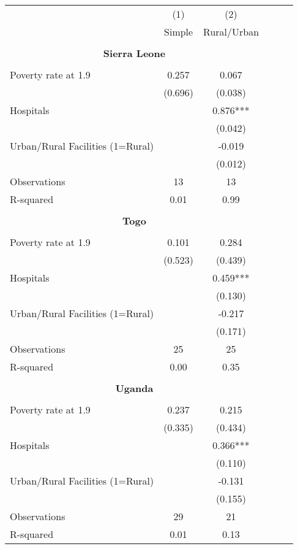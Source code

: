 \begin{tabular}{l*{5}{c}} \hline\hline
                &\multicolumn{1}{c}{(1)}&\multicolumn{1}{c}{(2)}\\
                &\multicolumn{1}{c}{Simple}&\multicolumn{1}{c}{Rural/Urban}\\
\hline \\ \multicolumn{3}{c}{\textbf{Sierra Leone}} \\\\[-1ex]
Poverty rate at 1.9&    0.257   &    0.067   \\
                &  (0.696)   &  (0.038)   \\
Hospitals       &            &    0.876***\\
                &            &  (0.042)   \\
Urban/Rural Facilities (1=Rural)&            &   -0.019   \\
                &            &  (0.012)   \\
\hline
Observations    &       13   &       13   \\
R-squared       &     0.01   &     0.99   \\
\hline \\ \multicolumn{3}{c}{\textbf{Togo}} \\\\[-1ex]
Poverty rate at 1.9&    0.101   &    0.284   \\
                &  (0.523)   &  (0.439)   \\
Hospitals       &            &    0.459***\\
                &            &  (0.130)   \\
Urban/Rural Facilities (1=Rural)&            &   -0.217   \\
                &            &  (0.171)   \\
\hline
Observations    &       25   &       25   \\
R-squared       &     0.00   &     0.35   \\
\hline \\ \multicolumn{3}{c}{\textbf{Uganda}} \\\\[-1ex]
Poverty rate at 1.9&    0.237   &    0.215   \\
                &  (0.335)   &  (0.434)   \\
Hospitals       &            &    0.366***\\
                &            &  (0.110)   \\
Urban/Rural Facilities (1=Rural)&            &   -0.131   \\
                &            &  (0.155)   \\
\hline
Observations    &       29   &       21   \\
R-squared       &     0.01   &     0.13   \\
\hline\hline \end{tabular}
